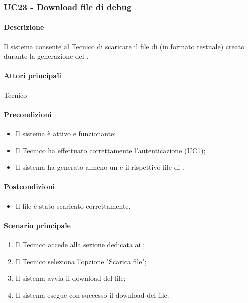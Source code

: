 \subsubsection{UC23 - Download file di debug}\label{UC23}
\paragraph*{Descrizione}
Il sistema consente al Tecnico di scaricare il file di  (in formato testuale) creato durante la generazione del .

\paragraph*{Attori principali}
Tecnico

\paragraph*{Precondizioni}
\begin{itemize}
  \item Il sistema è attivo e funzionante;
  \item Il Tecnico ha effettuato correttamente l'autenticazione (\hyperref[UC1]{UC1});
  \item Il sistema ha generato almeno un  e il rispettivo file di .
\end{itemize}

\paragraph*{Postcondizioni}
\begin{itemize}
  \item Il file è stato scaricato correttamente.
\end{itemize}

\paragraph*{Scenario principale}
\begin{enumerate}
  \item Il Tecnico accede alla sezione dedicata ai ;
  \item Il Tecnico seleziona l'opzione "Scarica file";
  \item Il sistema avvia il download del file;
  \item Il sistema esegue con successo il download del file.
\end{enumerate}


